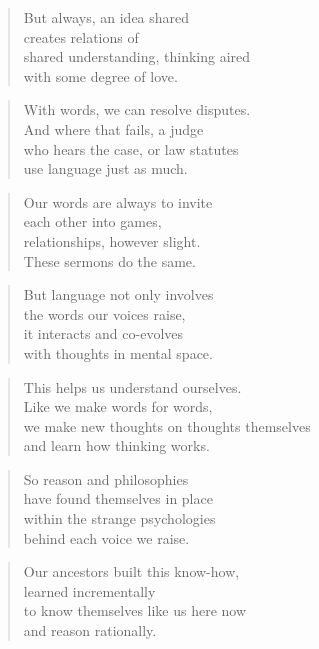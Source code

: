 \documentclass[10pt,a4paper]{article}
\begin{document}
\begin{multicols}{2}
\begin{verse}
But always, an idea shared\\
creates relations of\\
shared understanding, thinking aired\\
with some degree of love.
\end{verse}

\begin{verse}
With words, we can resolve disputes.\\
And where that fails, a judge\\
who hears the case, or law statutes\\
use language just as much.
\end{verse}

\begin{verse}
Our words are always to invite\\
each other into games,\\
relationships, however slight.\\
These sermons do the same.
\end{verse}

\begin{verse}
But language not only involves\\
the words our voices raise,\\
it interacts and co-evolves\\
with thoughts in mental space.
\end{verse}

\begin{verse}
This helps us understand ourselves.\\
Like we make words for words,\\
we make new thoughts on thoughts themselves\\
and learn how thinking works.
\end{verse}

\begin{verse}
So reason and philosophies\\
have found themselves in place\\
within the strange psychologies\\
behind each voice we raise.
\end{verse}

\begin{verse}
Our ancestors built this know-how,\\
learned incrementally\\
to know themselves like us here now\\
and reason rationally.
\end{verse}


\end{multicols}
\end{document}
